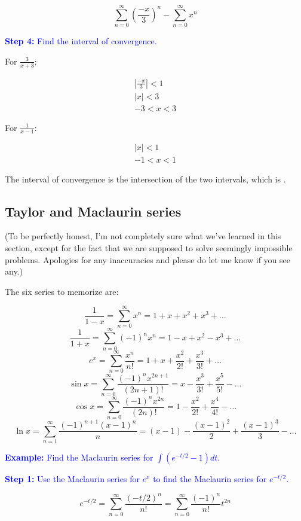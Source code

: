 \documentclass[letterpaper, 12pt]{article}
\newcommand{\example}[1]{\textcolor{blue}{\textbf{Example:} #1}}
\newcommand{\step}[2]{\textcolor{blue}{\textbf{Step #1:} #2}}
\begin{document}
$$\boxed{\sum_{n=0}^{\infty} \left(\frac{-x}{3}\right)^n - \sum_{n=0}^{\infty} x^n}$$

\step{4}{Find the interval of convergence.}

For $\displaystyle \frac{3}{x+3}$:

\begin{gather*}
\left| \frac{-x}{3} \right| < 1 \\
|x| < 3 \\
-3 < x < 3
\end{gather*}

For $\displaystyle \frac{1}{x-1}$:

\begin{gather*}
|x| < 1 \\
-1 < x < 1
\end{gather*}

The interval of convergence is the intersection of the two intervals, which is .

\subsection*{Taylor and Maclaurin series}

(To be perfectly honest, I'm not completely sure what we've learned in this section, except for the fact that we are supposed to solve seemingly impossible problems. Apologies for any inaccuracies and please do let me know if you see any.)

The six series to memorize are:

$$\frac{1}{1-x} = \sum_{n=0}^{\infty} x^n = 1 + x + x^2 + x^3 + \dots$$
$$\frac{1}{1+x} = \sum_{n=0}^{\infty} (-1)^n x^n = 1 - x + x^2 - x^3 + \dots$$
$$e^x = \sum_{n=0}^\infty \frac{x^n}{n!} = 1 + x + \frac{x^2}{2!} + \frac{x^3}{3!} + \dots$$
$$\sin x = \sum_{n=0}^\infty \frac{(-1)^n x^{2n+1}}{(2n+1)!} = x - \frac{x^3}{3!} + \frac{x^5}{5!} - \dots$$
$$\cos x = \sum_{n=0}^\infty \frac{(-1)^n x^{2n}}{(2n)!} = 1 - \frac{x^2}{2!} + \frac{x^4}{4!} - \dots$$
$$\ln x = \sum_{n=1}^\infty \frac{(-1)^{n+1} (x-1)^n}{n} = (x-1) - \frac{(x-1)^2}{2} + \frac{(x-1)^3}{3} - \dots$$

\example{Find the Maclaurin series for $\displaystyle \int (e^{-t/2}-1) dt$.}

\step{1}{Use the Maclaurin series for $e^x$ to find the Maclaurin series for $e^{-t/2}$.}

$$e^{-t/2} = \sum_{n=0}^\infty \frac{(-t/2)^n}{n!} = \sum_{n=0}^\infty \frac{(-1)^n}{n!} t^{2n}$$
\end{document}
